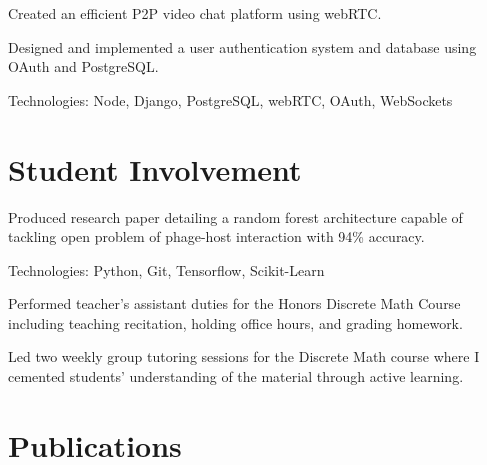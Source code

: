 \documentclass[]{deedy-resume-openfont}
\begin{document}
\begin{minipage}[t]{0.64\textwidth}
\descript{}
\location{}
\begin{tightemize} 
    \item Created an efficient P2P video chat platform using webRTC.
    \item Designed and implemented a user authentication system and database using OAuth
    and PostgreSQL.
    \item Technologies: Node, Django, PostgreSQL, webRTC, OAuth, WebSockets
\end{tightemize}
\sectionsep

\section{Student Involvement}
\begin{tightemize}
    \item Produced research paper detailing a random forest architecture capable of tackling 
    open problem of phage-host interaction with 94\% accuracy. 
    \item Technologies: Python, Git, Tensorflow, Scikit-Learn
\end{tightemize}
\sectionsep

\descript{}
\begin{tightemize}
    \item Performed teacher's assistant duties for the Honors Discrete Math Course including 
    teaching recitation, holding office hours, and grading homework.
    \item Led two weekly group tutoring sessions for the Discrete Math course where I cemented 
    students' understanding of the material through active learning.
\end{tightemize}
\sectionsep



\section{Publications} 
\renewcommand\refname{\vskip -1.5em} %


\nocite{*}

\end{minipage} 
\end{document}

